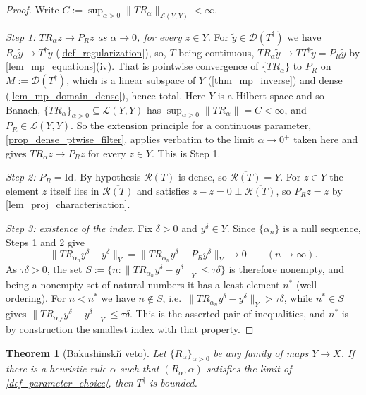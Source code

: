 \documentclass[a4paper]{report}
\theoremstyle{plain}
\newtheorem{theorem}{Theorem}[chapter]
\theoremstyle{definition}
\theoremstyle{remark}
\newcommand{\Ll}{\mathcal{L}}
\newcommand{\Ran}{\mathcal{R}}
\newcommand{\Dom}{\mathcal{D}}
\newcommand{\Id}{\mathrm{Id}}
\newcommand{\dg}{^{\dagger}}
\begin{document}
\begin{proof}
  Write $C := \sup_{\alpha > 0}\|TR_{\alpha}\|_{\Ll(Y,Y)} < \infty$.

  \emph{Step 1: $TR_{\alpha}z \to P_Rz$ as $\alpha \to 0$, for every $z \in Y$.}  For
  $\tilde{y} \in \Dom(T\dg)$ we have $R_{\alpha}\tilde{y} \to T\dg\tilde{y}$
  (\cref{def_regularization}), so, $T$ being continuous,
  $TR_{\alpha}\tilde{y} \to TT\dg\tilde{y} = P_R\tilde{y}$ by
  \cref{lem_mp_equations}(iv).  That is pointwise convergence of $\{TR_{\alpha}\}$ to
  $P_R$ on $M := \Dom(T\dg)$, which is a linear subspace of $Y$ (\cref{thm_mp_inverse})
  and dense (\cref{lem_mp_domain_dense}), hence total.  Here $Y$ is a Hilbert space and
  so Banach, $\{TR_{\alpha}\}_{\alpha>0} \subseteq \Ll(Y,Y)$ has
  $\sup_{\alpha>0}\|TR_{\alpha}\| = C < \infty$, and $P_R \in \Ll(Y,Y)$.  So the
  extension principle for a continuous parameter, \cref{prop_dense_ptwise_filter}, applies
  verbatim to the limit $\alpha \to 0^{+}$ taken here and gives
  $TR_{\alpha}z \to P_Rz$ for every $z \in Y$.  This is Step 1.

  \emph{Step 2: $P_R = \Id$.}  By hypothesis $\Ran(T)$ is dense, so
  $\overline{\Ran(T)} = Y$.  For $z \in Y$ the element $z$ itself lies in
  $\overline{\Ran(T)}$ and satisfies $z - z = 0 \perp \overline{\Ran(T)}$, so
  $P_Rz = z$ by \cref{lem_proj_characterisation}.

  \emph{Step 3: existence of the index.}  Fix $\delta > 0$ and $y^{\delta} \in Y$.  Since
  $\{\alpha_n\}$ is a null sequence, Steps 1 and 2 give
  \[
    \|TR_{\alpha_n}y^{\delta} - y^{\delta}\|_Y
      = \|TR_{\alpha_n}y^{\delta} - P_Ry^{\delta}\|_Y \longrightarrow 0
      \qquad (n \to \infty) .
  \]
  As $\tau\delta > 0$, the set
  $S := \{n : \|TR_{\alpha_n}y^{\delta} - y^{\delta}\|_Y \le \tau\delta\}$ is therefore
  nonempty, and being a nonempty set of natural numbers it has a least element $n^{*}$
  (well-ordering).  For $n < n^{*}$ we have $n \notin S$, i.e.\
  $\|TR_{\alpha_n}y^{\delta} - y^{\delta}\|_Y > \tau\delta$, while $n^{*} \in S$ gives
  $\|TR_{\alpha_{n^{*}}}y^{\delta} - y^{\delta}\|_Y \le \tau\delta$.  This is the asserted
  pair of inequalities, and $n^{*}$ is by construction the smallest index with that
  property.
\end{proof}


\begin{theorem}[Bakushinski\u{\i} veto]
  \label{thm_bakushinskii}
  Let $\{R_{\alpha}\}_{\alpha>0}$ be any family of maps $Y \to X$.  If there is a
  \emph{heuristic} rule $\alpha$ such that $(R_{\alpha}, \alpha)$ satisfies the limit of
  \cref{def_parameter_choice}, then $T\dg$ is bounded.
\end{theorem}
\end{document}
